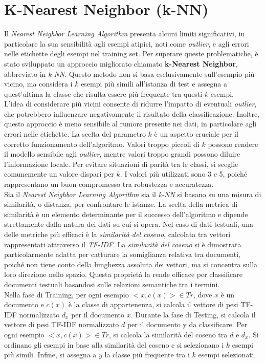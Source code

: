\documentclass{report}
\begin{document}
	\section{K-Nearest Neighbor (k-NN)}
	Il \textit{Nearest Neighbor Learning Algorithm} presenta alcuni limiti significativi, in particolare la sua sensibilità agli esempi atipici, noti come \textit{outlier}, e agli errori nelle etichette degli esempi nel training set. Per superare queste problematiche, è stato sviluppato un approccio migliorato chiamato \textbf{k-Nearest Neighbor}, abbreviato in \textit{k-NN}. Questo metodo non si basa esclusivamente sull'esempio più vicino, ma considera i \(k\) esempi più simili all'istanza di test e assegna a quest'ultima la classe che risulta essere più frequente tra questi \(k\) esempi.
	\vspace{\baselineskip}\\
	L'idea di considerare più vicini consente di ridurre l'impatto di eventuali \textit{outlier}, che potrebbero influenzare negativamente il risultato della classificazione. Inoltre, questo approccio è meno sensibile al rumore presente nei dati, in particolare agli errori nelle etichette. La scelta del parametro \(k\) è un aspetto cruciale per il corretto funzionamento dell'algoritmo. Valori troppo piccoli di \(k\) possono rendere il modello sensibile agli \textit{outlier}, mentre valori troppo grandi possono diluire l'informazione locale. Per evitare situazioni di parità tra le classi, si sceglie comunemente un valore dispari per \(k\). I valori più utilizzati sono 3 e 5, poiché rappresentano un buon compromesso tra robustezza e accuratezza.
	\vspace{\baselineskip}\\
	Sia il \textit{Nearest Neighbor Learning Algorithm} sia il \textit{k-NN} si basano su una misura di similarità, o distanza, per confrontare le istanze. La scelta della metrica di similarità è un elemento determinante per il successo dell'algoritmo e dipende strettamente dalla natura dei dati su cui si opera. Nel caso di dati testuali, una delle metriche più efficaci è la \textit{similarità del coseno}, calcolata tra vettori rappresentati attraverso il \textit{TF-IDF}. La \textit{similarità del coseno} si è dimostrata particolarmente adatta per catturare la somiglianza relativa tra documenti, poiché non tiene conto della lunghezza assoluta dei vettori, ma si concentra sulla loro direzione nello spazio. Questa proprietà la rende efficace per classificare documenti testuali basandosi sulle relazioni semantiche tra i termini.
	\vspace{\baselineskip}\\
	Nella fase di Training, per ogni esempio $<x, c(x)> \in Tr$, dove $x$ è un documento e $c(x)$ è la classe di appartenenza, si calcola il vettore di pesi TF-IDF normalizzato $d_x$ per il documento $x$. Durante la fase di Testing, si calcola il vettore di pesi TF-IDF normalizzato $d$ per il documento y da classificare. Per ogni esempio $<x, c(x)> \in Tr$, si calcola la similarità del coseno tra $d$ e $d_x$. Si ordinano gli esempi in base alla similarità del coseno e si selezionano i $k$ esempi più simili. Infine, si assegna a $y$ la classe più frequente tra i $k$ esempi selezionati.
\end{document}
